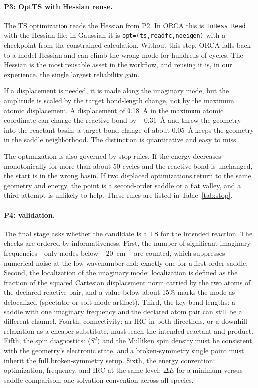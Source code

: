 \documentclass[11pt,a4paper]{article}
\begin{document}
\paragraph{P3: OptTS with Hessian reuse.}
The TS optimization reads the Hessian from P2. In ORCA this is \texttt{InHess Read} with the Hessian file; in Gaussian it is \texttt{opt=(ts,readfc,noeigen)} with a checkpoint from the constrained calculation. Without this step, ORCA falls back to a model Hessian and can climb the wrong mode for hundreds of cycles. The Hessian is the most reusable asset in the workflow, and reusing it is, in our experience, the single largest reliability gain.

If a displacement is needed, it is made along the imaginary mode, but the amplitude is scaled by the target bond-length change, not by the maximum atomic displacement. A displacement of 0.18~\AA{} in the maximum atomic coordinate can change the reactive bond by $-0.31$~\AA{} and throw the geometry into the reactant basin; a target bond change of about 0.05~\AA{} keeps the geometry in the saddle neighborhood. The distinction is quantitative and easy to miss.

The optimization is also governed by stop rules. If the energy decreases monotonically for more than about 50 cycles and the reactive bond is unchanged, the start is in the wrong basin. If two displaced optimizations return to the same geometry and energy, the point is a second-order saddle or a flat valley, and a third attempt is unlikely to help. These rules are listed in Table~\ref{tab:stop}.

\paragraph{P4: validation.}
The final stage asks whether the candidate is a TS for the intended reaction. The checks are ordered by informativeness. First, the number of significant imaginary frequencies---only modes below $-20$~cm$^{-1}$ are counted, which suppresses numerical noise at the low-wavenumber end: exactly one for a first-order saddle. Second, the localization of the imaginary mode: localization is defined as the fraction of the squared Cartesian displacement norm carried by the two atoms of the declared reactive pair, and a value below about 15\% marks the mode as delocalized (spectator or soft-mode artifact). Third, the key bond lengths: a saddle with one imaginary frequency and the declared atom pair can still be a different channel. Fourth, connectivity: an IRC in both directions, or a downhill relaxation as a cheaper substitute, must reach the intended reactant and product. Fifth, the spin diagnostics: $\langle S^2\rangle$ and the Mulliken spin density must be consistent with the geometry's electronic state, and a broken-symmetry single point must inherit the full broken-symmetry setup. Sixth, the energy convention: optimization, frequency, and IRC at the same level; $\Delta E$ for a minimum-versus-saddle comparison; one solvation convention across all species.
\end{document}
